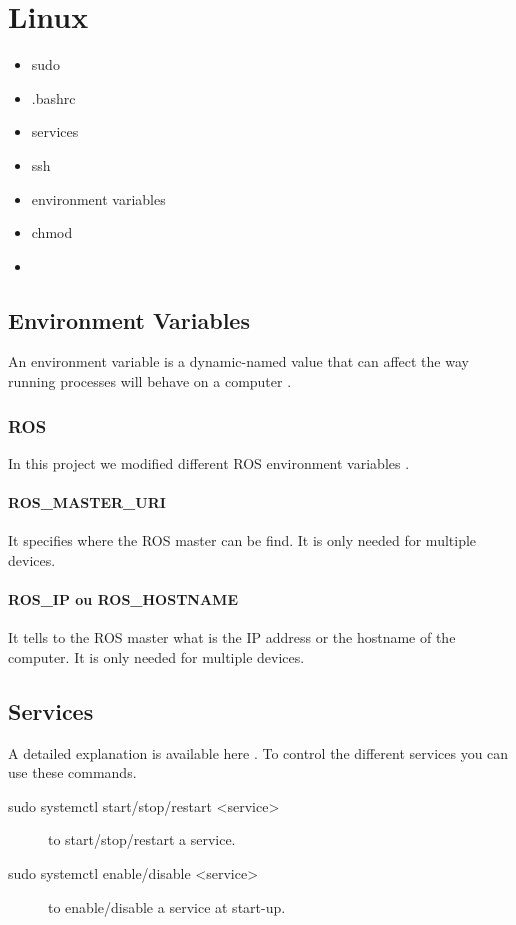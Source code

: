 \chapter{Linux}
    \begin{itemize}
        \item sudo
        \item .bashrc
        \item services
        \item ssh
        \item environment variables
        \item chmod
        \item 
    \end{itemize}

    \section{Environment Variables}
        An environment variable is a dynamic-named value that can affect the way running processes will behave on a computer \cite{wikipedia_env_var}.
        \subsection{ROS}
            In this project we modified different ROS environment variables \cite{ros_env_var}.
            \subsubsection{ROS\_MASTER\_URI}
                It specifies where the ROS master can be find.
                It is only needed for multiple devices.
                
            \subsubsection{ROS\_IP ou ROS\_HOSTNAME}
                It tells to the ROS master what is the IP address or the hostname of the computer.
                It is only needed for multiple devices.

    \section{Services} \label{services}
        A detailed explanation is available here \cite{techrepublic_services}.
        To control the different services you can use these commands.
        \begin{description}
            \item[sudo systemctl start/stop/restart <service>] to start/stop/restart a service.
            \item[sudo systemctl enable/disable <service>] to enable/disable a service at start-up.
        \end{description}